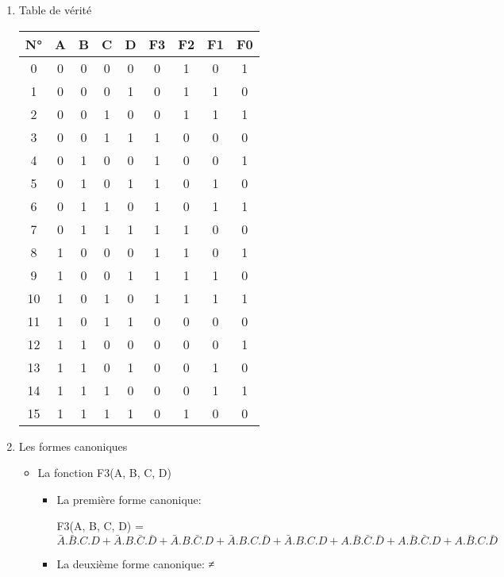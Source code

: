\begin{enumerate}
\begin{itemize}
         \end{itemize}
\item Table de vérité \\
        \begin{tabular}{|c|c|c|c|c||c|c|c|c|}
    \toprule
        N° &A & B & C & D & F3 & F2 & F1 & F0\\ \midrule0 & 0 & 0 & 0 & 0 & 0 & 1 & 0 & 1\\1 & 0 & 0 & 0 & 1 & 0 & 1 & 1 & 0\\2 & 0 & 0 & 1 & 0 & 0 & 1 & 1 & 1\\3 & 0 & 0 & 1 & 1 & 1 & 0 & 0 & 0\\\midrule4 & 0 & 1 & 0 & 0 & 1 & 0 & 0 & 1\\5 & 0 & 1 & 0 & 1 & 1 & 0 & 1 & 0\\6 & 0 & 1 & 1 & 0 & 1 & 0 & 1 & 1\\7 & 0 & 1 & 1 & 1 & 1 & 1 & 0 & 0\\\midrule8 & 1 & 0 & 0 & 0 & 1 & 1 & 0 & 1\\9 & 1 & 0 & 0 & 1 & 1 & 1 & 1 & 0\\10 & 1 & 0 & 1 & 0 & 1 & 1 & 1 & 1\\11 & 1 & 0 & 1 & 1 & 0 & 0 & 0 & 0\\\midrule12 & 1 & 1 & 0 & 0 & 0 & 0 & 0 & 1\\13 & 1 & 1 & 0 & 1 & 0 & 0 & 1 & 0\\14 & 1 & 1 & 1 & 0 & 0 & 0 & 1 & 1\\15 & 1 & 1 & 1 & 1 & 0 & 1 & 0 & 0\\\bottomrule
        \end{tabular}
        \item Les formes canoniques \\
\begin{itemize}
\item La fonction F3(A, B, C, D) \\


\begin{itemize}
\item La première forme canonique: 

F3(A, B, C, D) = $\bar A.\bar B.C.D + \bar A.B.\bar C.\bar D + \bar A.B.\bar C.D + \bar A.B.C.\bar D + \bar A.B.C.D + A.\bar B.\bar C.\bar D + A.\bar B.\bar C.D + A.\bar B.C.\bar D$
\item La deuxième forme canonique: ≠


\end{itemize}
\end{itemize}
\end{enumerate}

